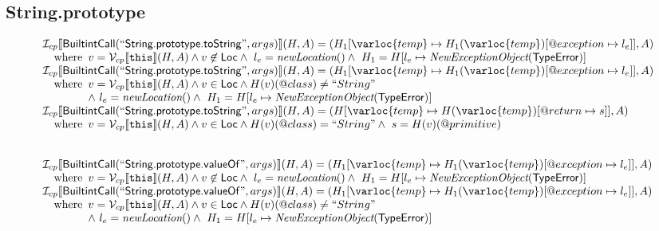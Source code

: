 \subsection{String.prototype}
\[
\begin{array}{l}
\I _{cp}\lbr \SF{BuiltintCall}(``\SF{String.prototype.toString}",args)\rbr(H,A)
 = (H_1[\varloc{temp}\mapsto H_1(\varloc{temp})[\varprop{exception}\mapsto l_e]], A) \\
\quad\wherec{
  v = \V _{cp}\lbr \TT{this}\rbr (H,A) \land v \not\in \SF{Loc}
  \land\ l_e = \hf{newLocation}() \land\ H_1=H[l_e\mapsto\hf{NewExceptionObject}(\SF{TypeError})] 
  }\\
  
\I _{cp}\lbr \SF{BuiltintCall}(``\SF{String.prototype.toString}",args)\rbr(H,A)
 = (H_1[\varloc{temp}\mapsto H_1(\varloc{temp})[\varprop{exception}\mapsto l_e]], A) \\
\quad\wherec{
  v = \V _{cp}\lbr \TT{this}\rbr (H,A) \land v \in \SF{Loc} \land H(v)(@class) \neq ``String"\\
  \land\ l_e = \hf{newLocation}() \land\ H_1=H[l_e\mapsto\hf{NewExceptionObject}(\SF{TypeError})] 
  }\\
  
\I _{cp}\lbr \SF{BuiltintCall}(``\SF{String.prototype.toString}",args)\rbr(H,A)
 = (H[\varloc{temp}\mapsto H(\varloc{temp})[\varprop{return}\mapsto s]], A) \\
\quad\wherec{ 
  v = \V _{cp}\lbr \TT{this}\rbr (H,A) \land v \in \SF{Loc} \land H(v)(@class) = ``String"
  \land\ s = H(v)(\varprop{primitive})
  }\\
\\\\


\I _{cp}\lbr \SF{BuiltintCall}(``\SF{String.prototype.valueOf}",args)\rbr(H,A)
 = (H_1[\varloc{temp}\mapsto H_1(\varloc{temp})[\varprop{exception}\mapsto l_e]], A) \\
\quad\wherec{
  v = \V _{cp}\lbr \TT{this}\rbr (H,A) \land v \not\in \SF{Loc}
  \land\ l_e = \hf{newLocation}() \land\ H_1=H[l_e\mapsto\hf{NewExceptionObject}(\SF{TypeError})] 
  }\\
  
\I _{cp}\lbr \SF{BuiltintCall}(``\SF{String.prototype.valueOf}",args)\rbr(H,A)
 = (H_1[\varloc{temp}\mapsto H_1(\varloc{temp})[\varprop{exception}\mapsto l_e]], A) \\
\quad\wherec{
  v = \V _{cp}\lbr \TT{this}\rbr (H,A) \land v \in \SF{Loc} \land H(v)(@class) \neq ``String"\\
  \land\ l_e = \hf{newLocation}() \land\ H_1=H[l_e\mapsto\hf{NewExceptionObject}(\SF{TypeError})] 
  }\\
  

\end{array}\]
